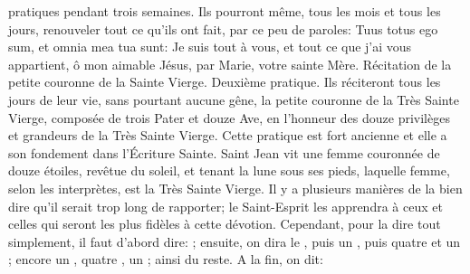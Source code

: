 pratiques pendant trois semaines.
Ils pourront même, tous les mois et tous les jours, renouveler tout ce qu'ils ont fait, par ce peu de paroles: Tuus
totus ego sum, et omnia mea tua sunt: Je suis tout à vous, et tout ce que j'ai vous appartient, ô mon aimable
Jésus, par Marie, votre sainte Mère.
Récitation de la petite couronne de la Sainte Vierge.
 Deuxième pratique. Ils réciteront tous les jours de leur vie, sans pourtant aucune gêne, la petite couronne de
la Très Sainte Vierge, composée de trois Pater et douze Ave, en l'honneur des douze privilèges et grandeurs de la
Très Sainte Vierge. Cette pratique est fort ancienne et elle a son fondement dans l'Écriture Sainte. Saint Jean vit
une femme couronnée de douze étoiles, revêtue du soleil, et tenant la lune sous ses pieds, laquelle femme, selon
les interprètes, est la Très Sainte Vierge.
 Il y a plusieurs manières de la bien dire qu'il serait trop long de rapporter; le Saint-Esprit les apprendra à ceux
et celles qui seront les plus fidèles à cette dévotion. Cependant, pour la dire tout simplement, il faut d'abord dire:
; ensuite, on dira le , puis un , puis quatre  et un ; encore un , quatre , un ; ainsi du reste. A la fin, on dit: 

